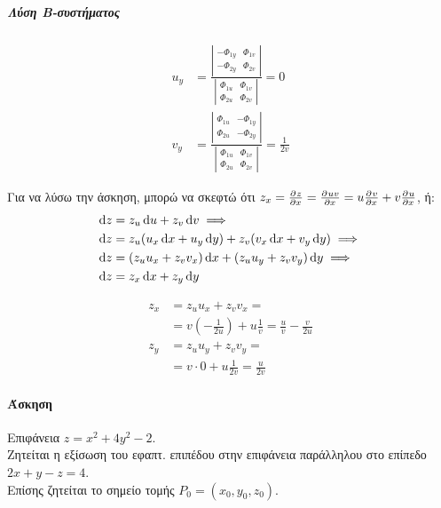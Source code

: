 \documentclass[11pt,a4paper,titlepage]{article}
\begin{document}
\subparagraph{Λύση Β-συστήματος}
\begin{align*}
u_y&=\frac{\left|
	\begin{matrix}
	-\Phi_{1y} & \Phi_{1v} \\
	-\Phi_{2y} & \Phi_{2v}
	\end{matrix}
	\right|
}{\left|\begin{matrix}
\Phi_{1u} & \Phi_{1v} \\
\Phi_{2u} & \Phi_{2v}
\end{matrix}
\right|}
 = 0
\\
v_y &= \frac{\left|
	\begin{matrix}
	\Phi_{1u} &-\Phi_{1y} \\
	\Phi_{2u} &-\Phi_{2y}
	\end{matrix}
	\right|
}{\left|\begin{matrix}
\Phi_{1u} & \Phi_{1v} \\
\Phi_{2u} & \Phi_{2v}
\end{matrix}
\right|} = \frac{1}{2v}
\end{align*}

Για να λύσω την άσκηση, μπορώ να σκεφτώ ότι \( z_x=\pd{z}{x} = \pd{uv}{x} = u\pd{v}{x}+v\pd{u}{x} \), ή:
\begin{align*}
\dif z &= z_u\dif u + z_v\dif v \implies \\
\dif z &= z_u(u_x\dif x+u_y\dif y)+z_v(v_x\dif x+v_y\dif y) \implies \\
\dif z &= (z_uu_x+z_vv_x)\dif x+(z_uu_y+z_vv_y)\dif y \implies \\
\dif z &= z_x\dif x + z_y\dif y
\end{align*}

\begin{align*}
z_x &= z_uu_x+z_vv_x = \\
    &= v \left(-\frac{1}{2u} \right)+u\frac{1}{v}=\frac{u}{v}-\frac{v}{2u}
    \\
z_y &= z_uu_y+z_vv_y = \\
&= v \cdot 0 +u\frac{1}{2v}=\frac{u}{2v}
\end{align*}

\paragraph{Άσκηση}
Επιφάνεια \( z=x^2+4y^2-2 \).\\
Ζητείται η εξίσωση του εφαπτ. επιπέδου στην επιφάνεια παράλληλου στο επίπεδο \( 2x+y-z=4 \).\\
Επίσης ζητείται το σημείο τομής \( P_0 = (x_0,y_0,z_0) \).
\end{document}
